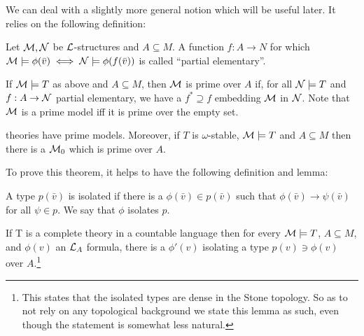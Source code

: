 We can deal with a slightly more general notion which will be useful later. 
It relies on the following definition:

\begin{definition}\label{definition_partial_elementary}
Let \(\mathcal{M}, \mathcal{N}\) be \(\mathcal{L}\)-structures and \(A \subseteq M\).
A function \(f:A \to N\) for which \(\mathcal{M} \models \phi(\bar{v}) \iff \mathcal{N} \models \phi(f(\bar{v}))\) is called ``partial elementary''.
\end{definition}

\begin{definition}\label{definition_prime_over}
If \(\mathcal{M} \models T\) as above and \(A \subseteq M\), then \(\mathcal{M}\) is prime over \(A\) if, for all \(\mathcal{N} \models T\) and \(f:A \to \mathcal{N}\) partial elementary, we have a \(f^* \supseteq f\) embedding \(\mathcal{M}\) in \(\mathcal{N}\). 
Note that \(\mathcal{M}\) is a prime model iff it is prime over the empty set. 
\end{definition}


\begin{theorem}\label{thm_omst_prime}
\omst theories have prime models. Moreover, if \(T\) is \(\omega\)-stable, \(\mathcal{M} \models T\) and \(A \subseteq M\) then there is a \(\mathcal{M}_0\) which is prime over \(A\). 
\end{theorem}

\noindent To prove this theorem, it helps to have the following definition and lemma:
\begin{definition}\label{definition_isolated_types}
A type \(p(\bar{v})\) is isolated if there is a \(\phi(\bar{v}) \in p(\bar{v})\) such that \(\phi(\bar{v}) \to \psi(\bar{v})\) for all \(\psi \in p\). We say that \(\phi\) isolates \(p\). 
\end{definition}

\begin{lemma}\label{isolated_types_are_dense}
If T is a complete \omst theory in a countable language then for every \(\mathcal{M} \models T\), \(A \subseteq M\), and \(\phi(v)\) an \(\mathcal{L}_A\) formula, there is a \(\phi'(v)\) isolating a type \(p(v) \ni \phi(v)\) over \(A\).\footnote{This states that the isolated types are dense in the Stone topology. So as to not rely on any topological background we state this lemma as such, even though the statement is somewhat less natural.}
\end{lemma}

